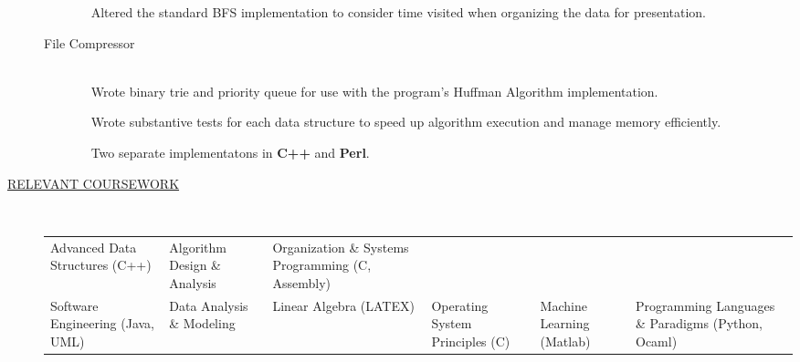 \documentclass{article}
\begin{document}
\begin{description}
\begin{description}
            \textbullet ~ Altered the standard BFS implementation to consider time visited when 
            organizing the data for presentation.

		\item[File Compressor] \hfill \\
            \textbullet ~ Wrote binary trie and priority queue for use with the program's Huffman Algorithm implementation.
                
            \textbullet ~ Wrote substantive tests for each data
                structure to speed up algorithm execution and manage memory efficiently.
                
            \textbullet ~ Two separate implementatons in {\bf C++} and {\bf Perl}.
                
		\end{description}

        \item[\underline{RELEVANT COURSEWORK}]\hfill \\

        \begin{tabular}{l|l|l}
            Advanced Data Structures (C++)& Algorithm Design \& Analysis & Organization \& Systems Programming (C, Assembly)\\
         Software Engineering (Java, UML) & Data Analysis \& Modeling & Linear Algebra (LATEX) & 
              Operating System Principles (C) & Machine Learning (Matlab) & Programming Languages \& Paradigms (Python, Ocaml) \\
        \end{tabular}


\end{description}
\end{document}
